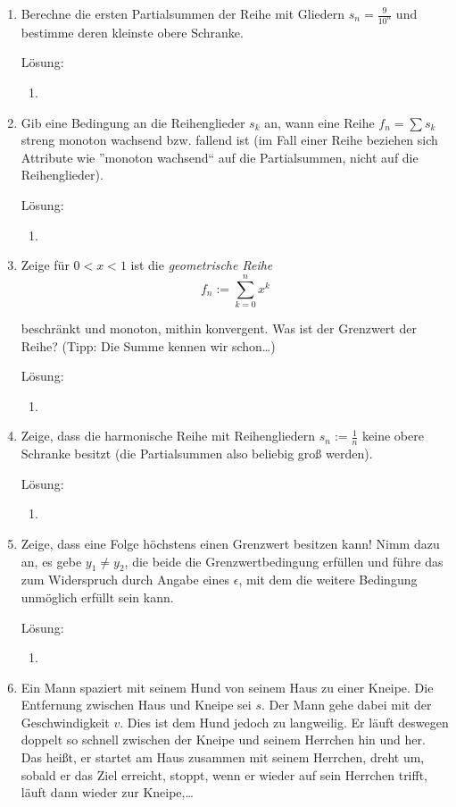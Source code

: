 \documentclass[../main.tex]{subfiles}
\begin{document}
\begin{enumerate}
	\item Berechne die ersten Partialsummen der Reihe mit Gliedern \( s_n = \frac{9}{10^n} \) und
          bestimme deren kleinste obere Schranke. 
          
          Lösung:
          \begin{enumerate}
              \item 
          \end{enumerate}
	\item Gib eine Bedingung an die Reihenglieder \( s_k \) an, wann eine Reihe \( f_n = \sum s_k \)
	      streng monoton wachsend bzw. fallend ist (im Fall einer Reihe beziehen sich
	      Attribute wie ”monoton wachsend“ auf die Partialsummen, nicht auf die
	      Reihenglieder).
          
          Lösung:
          \begin{enumerate}
              \item 
          \end{enumerate}
	\item Zeige für \( 0 < x < 1  \) ist die \textit{geometrische Reihe}
	      \[ f_n := \sum_{k = 0}^{n} x^k \]

	      beschränkt und monoton, mithin konvergent. Was ist der Grenzwert der Reihe?
	      (Tipp: Die Summe kennen wir schon\dots )
          
          Lösung:
          \begin{enumerate}
              \item 
          \end{enumerate}
	\item Zeige, dass die harmonische Reihe mit Reihengliedern \( s_n := \frac{1}{n} \) keine obere
	      Schranke besitzt (die Partialsummen also beliebig groß werden).
          
          Lösung:
          \begin{enumerate}
              \item 
          \end{enumerate}
	\item Zeige, dass eine Folge höchstens einen Grenzwert besitzen kann!
	      Nimm dazu an, es gebe \( y_1 \neq y_2 \), die beide die Grenzwertbedingung erfüllen und
	      führe das zum Widerspruch durch Angabe eines \( \epsilon \), mit dem die weitere Bedingung
	      unmöglich erfüllt sein kann.
          
          Lösung:
          \begin{enumerate}
              \item 
          \end{enumerate}
	\item Ein Mann spaziert mit seinem Hund von seinem Haus zu einer Kneipe. Die
	      Entfernung zwischen Haus und Kneipe sei \( s \). Der Mann gehe dabei mit der
	      Geschwindigkeit \( v \). Dies ist dem Hund jedoch zu langweilig. Er läuft deswegen
	      doppelt so schnell zwischen der Kneipe und seinem Herrchen hin und her.
	      Das heißt, er startet am Haus zusammen mit seinem Herrchen, dreht um,
	      sobald er das Ziel erreicht, stoppt, wenn er wieder auf sein Herrchen trifft,
	      läuft dann wieder zur Kneipe,\dots


\end{enumerate}
\end{document}
